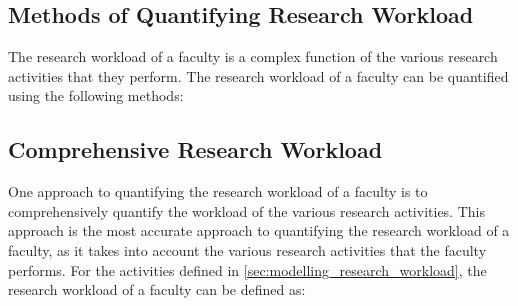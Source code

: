 \subsection{Methods of Quantifying Research Workload}

The research workload of a faculty is a complex function of the various research activities that they perform. The research workload of a faculty can be quantified using the following methods:

\subsection{Comprehensive Research Workload}

One approach to quantifying the research workload of a faculty is to comprehensively quantify the workload of the various research activities. This approach is the most accurate approach to quantifying the research workload of a faculty, as it takes into account the various research activities that the faculty performs. For the activities defined in \autoref{sec:modelling_research_workload}, the research workload of a faculty can be defined as:

